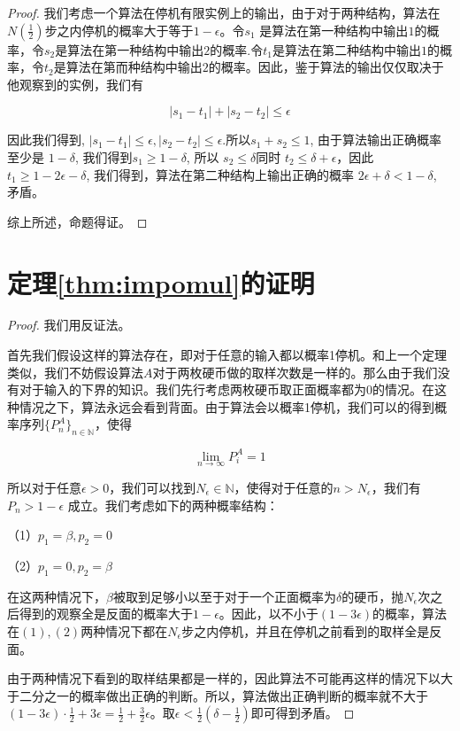 \documentclass[bachelor]{thuthesis}
\begin{document}
\begin{proof}
我们考虑一个算法在停机有限实例上的输出，由于对于两种结构，算法在$N(\frac{1}{2})$步之内停机的概率大于等于$1-\epsilon$。令$s_1$ 是算法在第一种结构中输出$1$的概率，令$s_2$是算法在第一种结构中输出$2$的概率.令$t_1$是算法在第二种结构中输出$1$的概率，令$t_2$是算法在第而种结构中输出$2$的概率。因此，鉴于算法的输出仅仅取决于他观察到的实例，我们有

\[|s_1-t_1|+|s_2-t_2|\le \epsilon\]

因此我们得到, $|s_1-t_1|\le \epsilon, |s_2-t_2|\le \epsilon$.所以$s_1+s_2\le 1$, 由于算法输出正确概率至少是 $1-\delta$, 我们得到$s_1\ge 1-\delta$, 所以 $s_2\le \delta$同时 $t_2\le \delta+\epsilon$，因此 $t_1\ge 1-2\epsilon-\delta$, 我们得到，算法在第二种结构上输出正确的概率 $2\epsilon+\delta<1-\delta$, 矛盾。

综上所述，命题得证。

\end{proof}

\section{定理\ref{thm:impomul}的证明}


\begin{proof}

我们用反证法。

首先我们假设这样的算法存在，即对于任意的输入都以概率1停机。和上一个定理类似，我们不妨假设算法$A$对于两枚硬币做的取样次数是一样的。那么由于我们没有对于输入的下界的知识。我们先行考虑两枚硬币取正面概率都为$0$的情况。在这种情况之下，算法永远会看到背面。由于算法会以概率1停机，我们可以的得到概率序列$\{P^A_n\}_{n\in \mathbb{N}}$，使得

\[\lim_{n\to \infty}P_i^A=1\]

所以对于任意$\epsilon>0$，我们可以找到$N_{\epsilon}\in \mathbb{N}$，使得对于任意的$n>N_{\epsilon}$，我们有$P_n>1-\epsilon$ 成立。我们考虑如下的两种概率结构：

（1）$p_1=\beta,p_2=0$

（2）$p_1=0,p_2=\beta$

在这两种情况下，$\beta$被取到足够小以至于对于一个正面概率为$\delta$的硬币，抛$N_{\epsilon}$次之后得到的观察全是反面的概率大于$1-\epsilon$。因此，以不小于$(1-3\epsilon)$的概率，算法在$(1),(2)$两种情况下都在$N_{\epsilon}$步之内停机，并且在停机之前看到的取样全是反面。

由于两种情况下看到的取样结果都是一样的，因此算法不可能再这样的情况下以大于二分之一的概率做出正确的判断。所以，算法做出正确判断的概率就不大于$(1-3\epsilon)\cdot\frac{1}{2}+3\epsilon=\frac{1}{2}+\frac{3}{2}\epsilon$。取$\epsilon<\frac{1}{2}(\delta-\frac{1}{2})$即可得到矛盾。

\end{proof}
\end{document}
